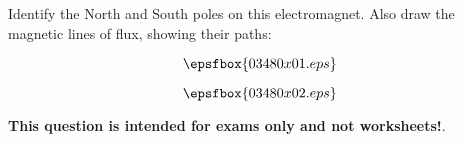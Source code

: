 

Identify the North and South poles on this electromagnet.  Also draw the magnetic lines of flux, showing their paths:

\vskip 20pt

$$\epsfbox{03480x01.eps}$$







$$\epsfbox{03480x02.eps}$$







{\bf This question is intended for exams only and not worksheets!}.




